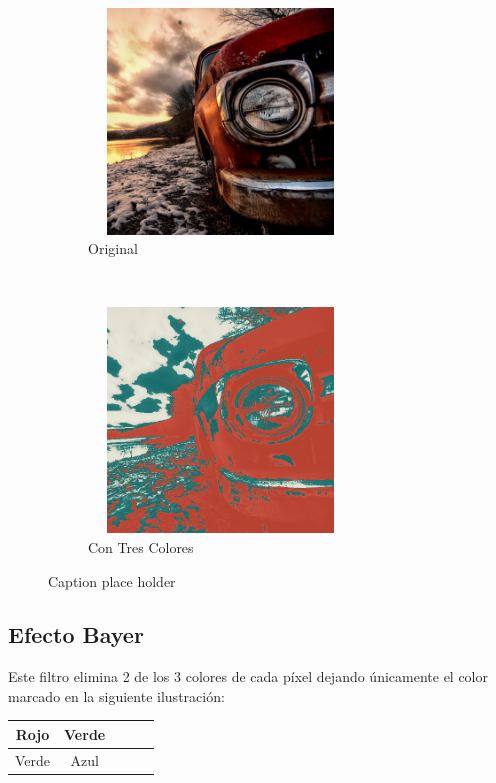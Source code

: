 \begin{figure}[H]
    \centering
    \begin{subfigure}[H]{0.5\textwidth}
        \centering
        \includegraphics[width=7cm, height=6cm]{images/car.png}
        \caption{Original}
    \end{subfigure}%
    ~ 
    \begin{subfigure}[H]{0.5\textwidth}
        \centering
        \includegraphics[width=7cm, height=6cm]{images/img_tresColores.png}
        \caption{Con Tres Colores}
    \end{subfigure}
    \caption{Caption place holder}
\end{figure} 


\subsection{Efecto Bayer}

Este filtro elimina 2 de los 3 colores de cada píxel dejando únicamente el color marcado en la siguiente ilustración:

\begin{table}[h]
\begin{center}
\begin{tabular}{|c|c|c|c|c|}
\hline
 Rojo     & Verde \\ \hline
 Verde    & Azul \\ \hline
\end{tabular}
\end{center}
\end{table}

